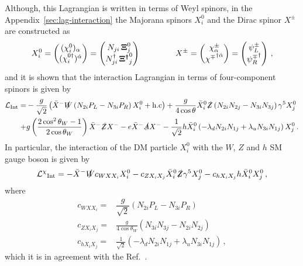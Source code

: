 Although, this Lagrangian is written in terms of Weyl spinors,
in the  Appendix~\ref{sec:lag-interaction}
the Majorana spinors $X_i^0$ and the Dirac spinor $X^{\pm}$  are constructed as
\begin{align}
X_i^0=\begin{pmatrix}
(\chi_{i}^0)_\alpha \\ (\chi_i^{0\dagger})^{\dot{\alpha}}
\end{pmatrix}
=\begin{pmatrix}
N_{ji}\,\boldsymbol{\Xi}^{0}_j \\
N_{ji}^{\dagger}\,\boldsymbol{{\Xi}^{\dagger}}^{0}_j
\end{pmatrix}
\hspace{1.5 cm}
X^{\pm}=\begin{pmatrix}
\chi^{\pm}_{\alpha} \\ {\chi^{\mp}}^{\dagger\dot{\alpha}}
\end{pmatrix}
=\begin{pmatrix}
\psi_L^{\pm} \\
{\psi_R^{\mp}}^{\dagger}
\end{pmatrix}\,,
\end{align}
%
and it is shown that the interaction Lagrangian in terms of four-component spinors is given by
%
\begin{align}
\label{eq:lint4}
\mathcal{L}_{\text{Int}}= & 
-\dfrac{g}{\sqrt{2}}\left(\bar{X}^-\slashed{W}\left(N_{2i}P_L-N_{3i}P_R\right)X_i^0 + \text{h.c}\right)
+ \dfrac{g}{4\cos\theta}\bar{X}_i^0\slashed{Z}\left(N_{2i}N_{2j}-N_{3i}N_{3j}\right)\gamma^5X_j^0 \nonumber\\
+& g\left(\dfrac{2\cos^2\theta_W-1}{2\cos\theta_W}\right)
\bar{X}^-\slashed{Z}X^-
-e\bar{X}^-\slashed{A}X^- 
-\dfrac{1}{\sqrt{2}}h\bar{X}_i^0\left(-\lambda_dN_{2i}N_{1j} + \lambda_uN_{3i}N_{1j}\right)X_j^0\,.
\end{align}
%
In particular, the interaction of the DM particle $X_i^0$ with the $W$, $Z$ and $h$ SM gauge boson is given by 
%
\begin{align}
\mathcal{L^{\chi}}_{\text{Int}}=
-\bar{X}^-\slashed{W}c_{WXX_i}X_i^0
-c_{ZX_iX_j}\bar{X}_i^0\slashed{Z}\gamma^{5}X_j^0
-c_{hX_iX_j}h\bar{X}_i^0X_j^0 \,,
\end{align}
where 
\begin{align}
c_{WXX_i}=& \dfrac{g}{\sqrt{2}}\left(N_{2i}P_L-N_{3i}P_R\right)  \label{eq:cWXXi}\\
c_{ZX_iX_j}=&\frac{g}{4\cos\theta_W}(N_{3i}N_{3j}-N_{2i}N_{2j}) \label{eq:cZXiXj}\\
c_{hX_iX_j}=&\frac{1}{\sqrt{2}}(-\lambda_dN_{2i}N_{1j}+\lambda_uN_{3i}N_{1j})\label{eq:cHXiXj}\,,
\end{align}
%
which it is in agreement with the Ref.~\cite{Abdallah:2015ter}.
 
